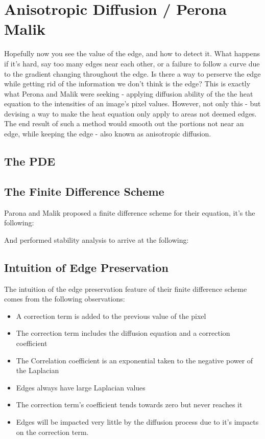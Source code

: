 \documentclass{article}
\begin{document}
\section*{Anisotropic Diffusion / Perona Malik}
Hopefully now you see the value of the edge, and how to detect it. What happens if it's hard, say too many edges near each other, or a failure to follow a curve due to the gradient changing throughout the edge. Is there a way to perserve the edge while getting rid of the information we don't think is the edge? This is exactly what Perona and Malik were seeking - applying diffusion ability of the the heat equation to the intensities of an image's pixel values. However, not only this - but devising a way to make the heat equation only apply to areas not deemed edges. The end result of such a method would smooth out the portions not near an edge, while keeping the edge - also known as anisotropic diffusion.

\subsection*{The PDE}

\subsection*{The Finite Difference Scheme}
Parona and Malik proposed a finite difference scheme for their equation, it's the following:

And performed stability analysis to arrive at the following:


\subsection*{Intuition of Edge Preservation}
The intuition of the edge preservation feature of their finite difference scheme comes from the following observations:
\begin{itemize}
	\item A correction term is added to the previous value of the pixel
	\item The correction term includes the diffusion equation and a correction coefficient
	\item The Correlation coefficient is an exponential taken to the negative power of the Laplacian
	\item Edges always have large Laplacian values
	\item The correction term's coefficient tends towards zero but never reaches it
	\item Edges will be impacted very little by the diffusion process due to it's impacts on the correction term.
\end{itemize}
\end{document}

